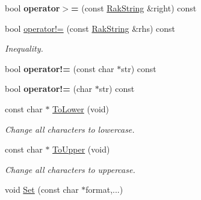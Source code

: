 \begin{DoxyCompactItemize}
\item 
\hypertarget{class_rak_net_1_1_rak_string_a3a7b6cb975e7febe70487b339e8ade58}{bool {\bfseries operator$>$=} (const \hyperlink{class_rak_net_1_1_rak_string}{Rak\-String} \&right) const }\label{class_rak_net_1_1_rak_string_a3a7b6cb975e7febe70487b339e8ade58}

\item 
\hypertarget{class_rak_net_1_1_rak_string_ac125aacc217b6d84c5c93d9893e9c054}{bool \hyperlink{class_rak_net_1_1_rak_string_ac125aacc217b6d84c5c93d9893e9c054}{operator!=} (const \hyperlink{class_rak_net_1_1_rak_string}{Rak\-String} \&rhs) const }\label{class_rak_net_1_1_rak_string_ac125aacc217b6d84c5c93d9893e9c054}

\begin{DoxyCompactList}\small\item\em Inequality. \end{DoxyCompactList}\item 
\hypertarget{class_rak_net_1_1_rak_string_a725613d15c4d3e85c1344f02c51413e3}{bool {\bfseries operator!=} (const char $\ast$str) const }\label{class_rak_net_1_1_rak_string_a725613d15c4d3e85c1344f02c51413e3}

\item 
\hypertarget{class_rak_net_1_1_rak_string_a5956ac4020e7082b2a28ef1360df9dec}{bool {\bfseries operator!=} (char $\ast$str) const }\label{class_rak_net_1_1_rak_string_a5956ac4020e7082b2a28ef1360df9dec}

\item 
\hypertarget{class_rak_net_1_1_rak_string_a3fb93d1bd2bb2ce06c4797956f89f476}{const char $\ast$ \hyperlink{class_rak_net_1_1_rak_string_a3fb93d1bd2bb2ce06c4797956f89f476}{To\-Lower} (void)}\label{class_rak_net_1_1_rak_string_a3fb93d1bd2bb2ce06c4797956f89f476}

\begin{DoxyCompactList}\small\item\em Change all characters to lowercase. \end{DoxyCompactList}\item 
\hypertarget{class_rak_net_1_1_rak_string_aa4c723f521bede5c1bd468f499509bdd}{const char $\ast$ \hyperlink{class_rak_net_1_1_rak_string_aa4c723f521bede5c1bd468f499509bdd}{To\-Upper} (void)}\label{class_rak_net_1_1_rak_string_aa4c723f521bede5c1bd468f499509bdd}

\begin{DoxyCompactList}\small\item\em Change all characters to uppercase. \end{DoxyCompactList}\item 
\hypertarget{class_rak_net_1_1_rak_string_a65c2fce7fb202deed3e6b0b05b0d0b77}{void \hyperlink{class_rak_net_1_1_rak_string_a65c2fce7fb202deed3e6b0b05b0d0b77}{Set} (const char $\ast$format,...)}\label{class_rak_net_1_1_rak_string_a65c2fce7fb202deed3e6b0b05b0d0b77}


\end{DoxyCompactItemize}
